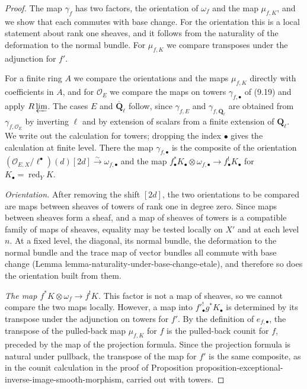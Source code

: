 \documentclass[11pt]{article}
\begin{document}
\begin{proof}[{Proof}]\label{bp77}%
The map \(\gamma_f\) has two factors, the orientation of \(\omega_f\) and the map \(\mu_{f,K}\), and we show that each commutes with base change. For the orientation this is a local statement about rank one sheaves, and it follows from the naturality of the deformation to the normal bundle. For \(\mu_{f,K}\) we compare transposes under the adjunction for \(f'\).

For a finite ring \(A\) we compare the orientations and the maps \(\mu_{f,K}\) directly with coefficients in \(A\), and for \(\mathcal O_E\) we compare the maps on towers \(\gamma_{f,\bullet}\) of (9.19) and apply \(R\varprojlim\). The cases \(E\) and \(\overline{\mathbf Q}_\ell\) follow, since \(\gamma_{f,E}\) and \(\gamma_{f,\overline{\mathbf Q}_\ell}\) are obtained from \(\gamma_{f,\mathcal O_E}\) by inverting \(\ell\) and by extension of scalars from a finite extension of \(\mathbf Q_\ell\). We write out the calculation for towers; dropping the index \(\bullet\) gives the calculation at finite level. There the map \(\gamma_{f,\bullet}\) is the composite of the orientation \((\mathcal O_{E,X}/\ell^\bullet)(d)[2d]\xrightarrow{\sim}\omega_{f,\bullet}\) and the map \(f_\bullet^*K_\bullet\otimes\omega_{f,\bullet}\to f_\bullet^!K_\bullet\) for \(K_\bullet=\operatorname{red}_YK\).

\emph{Orientation.} After removing the shift \([2d]\), the two orientations to be compared are maps between sheaves of towers of rank one in degree zero. Since maps between sheaves form a sheaf, and a map of sheaves of towers is a compatible family of maps of sheaves, equality may be tested locally on \(X'\) and at each level \(n\). At a fixed level, the diagonal, its normal bundle, the deformation to the normal bundle and the trace map of vector bundles all commute with base change (Lemma lemma-naturality-under-base-change-etale), and therefore so does the orientation built from them.

\emph{The map \(f^*K\otimes\omega_f\to f^!K\).} This factor is not a map of sheaves, so we cannot compare the two maps locally. However, a map into \(f'^!_\bullet g^*K_\bullet\) is determined by its transpose under the adjunction on towers for \(f'\). By the definition of \(e_{f,\bullet}\), the transpose of the pulled-back map \(\mu_{f,K}\) for \(f\) is the pulled-back counit for \(f\), preceded by the map of the projection formula. Since the projection formula is natural under pullback, the transpose of the map for \(f'\) is the same composite, as in the counit calculation in the proof of Proposition proposition-exceptional-inverse-image-smooth-morphism, carried out with towers.
\end{proof}
\end{document}

